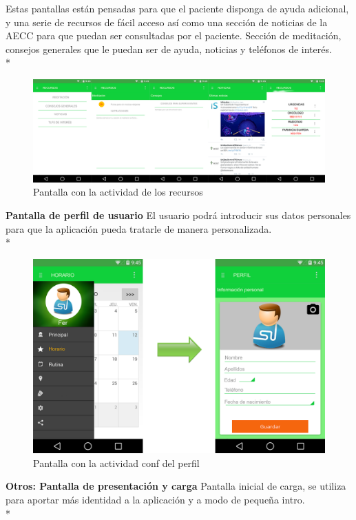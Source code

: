 \documentclass[../pfc.tex]{subfiles}
\begin{document}
		
		
		Estas pantallas están pensadas para que el paciente disponga de ayuda adicional, y una serie de recursos de fácil acceso así como una sección de noticias de la AECC para que puedan ser consultadas por el paciente.
		Sección de meditación, consejos generales que le puedan ser de ayuda, noticias y teléfonos de interés. \\*
		
		\begin{figure}[H]
			\centering
			\includegraphics[width=0.9\linewidth]{../images/recursos}
			\caption{Pantalla con la actividad de los recursos}
			\label{fig:recursos}
		\end{figure}
		
		
		\textbf{Pantalla de perfil de usuario}
		El usuario podrá introducir sus datos personales para que la aplicación pueda tratarle de manera personalizada.\\*
		
		\begin{figure}[H]
			\centering
			\includegraphics[width=0.7\linewidth]{../images/perfil_2}
			\caption{Pantalla con la actividad conf del perfil}
			\label{fig:perfil_2}
		\end{figure}
		
		
		\textbf{Otros: Pantalla de presentación y carga}
		Pantalla inicial de carga, se utiliza para aportar más identidad a la aplicación y a modo de pequeña intro.\\*
		
\end{document}
